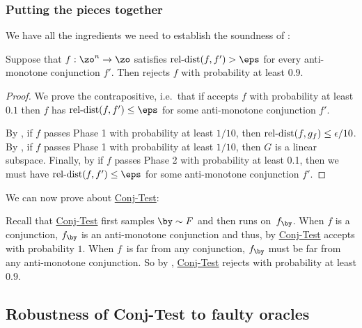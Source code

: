 \documentclass[11pt]{article}
\theoremstyle{definition}
\begin{document}
\subsubsection{Putting the pieces together}
We have all the ingredients we need to establish the soundness of : 
\begin{theorem}\label{thm: f isn't mono conj}
    Suppose that $f: \zo^n \to \zo$ satisfies $\reldist(f,f') >\eps$ for every anti-monotone conjunction $f'$. Then  rejects $f$ with probability at least 0.9.
\end{theorem}
\begin{proof}
We prove the contrapositive, i.e.~that if  accepts $f$ with probability at least $0.1$ then $f$ has $\reldist(f,f') \leq \eps$ for some anti-monotone conjunction $f'$.

By , if $f$ passes Phase 1 with probability at least $1/10$, then $\mathrm{rel}\text{-}\mathrm{dist}(f,g_f) \leq \epsilon/10$. 
By , if $f$ passes Phase 1  with probability at least $1/10$, then $G$ is a linear subspace. 
Finally, by  if $f$ passes Phase 2  with probability at least 0.1, then we must have $\reldist(f,f') \leq \eps$ for some anti-monotone conjunction $f'.$
\end{proof}
We can now prove  about \hyperlink{Algorithm2}{\sc Conj-Test}:
\begin{proofof}{}
    Recall that \hyperlink{Algorithm2}{\sc Conj-Test} first samples $\by \sim F$ and then runs  on~$f_{\by}$. 
    When $f$ is a conjunction, $f_{\by}$ is an anti-monotone conjunction and thus, by  \hyperlink{Algorithm2}{\sc Conj-Test}   accepts with probability $1$.
    When  $f$~is far from any conjunction, $f_{\by}$ must be far from any anti-monotone conjunction. So by , \hyperlink{Algorithm2}{\sc Conj-Test} rejects with probability at least $0.9$. 
\end{proofof}
\subsection{Robustness of  {\sc Conj-Test} to faulty oracles} 
\end{document}
